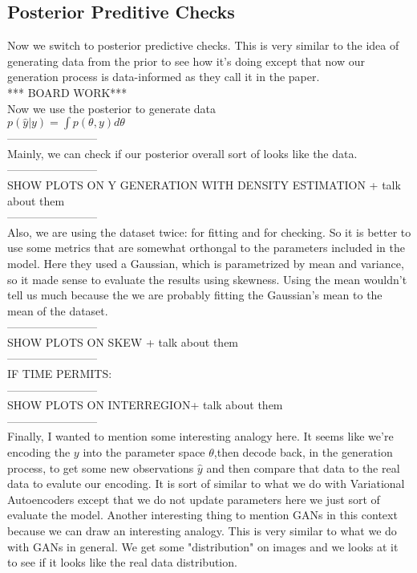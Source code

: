 \documentclass[]{article}
\begin{document}
\subsection*{Posterior Preditive Checks}
Now we switch to posterior predictive checks. This is very similar to the idea of generating data from the prior to see how it's doing except that now our generation process is data-informed as they call it in the paper.\\ 
*** BOARD WORK*** \\
Now we use the posterior to generate data \\
$p(\hat{y}| y) = \int p(\theta, y) d\theta$\\
------------------------\\
Mainly, we can check if our posterior overall sort of looks like the data.\\
------------------------ \\SHOW PLOTS ON Y GENERATION WITH DENSITY ESTIMATION + talk about them\\ ------------------------\\

Also, we are using the dataset twice: for fitting and for checking. So it is better to use some metrics that are somewhat orthongal to the parameters included in the model. Here they used a Gaussian, which is parametrized by mean and variance, so it made sense to evaluate the results using skewness. Using the mean wouldn't tell us much because the we are probably fitting the Gaussian's mean to the mean of the dataset.  \\
------------------------ \\SHOW PLOTS ON SKEW + talk about them\\ ------------------------\\
IF TIME PERMITS: \\ 
------------------------\\ SHOW PLOTS ON INTERREGION+ talk about them \\------------------------\\

Finally, I wanted to mention some interesting analogy here. It seems like we're encoding the $y$ into the parameter space $\theta$,then decode back, in the generation process, to get some new observations $\hat{y}$ and then compare that data to the real data to evalute our encoding. It is sort of similar to what we do with Variational Autoencoders except that we do not update parameters here we just sort of evaluate the model. Another interesting thing to mention GANs in this context because we can draw an interesting analogy. This is very similar to what we do with GANs in general. We get some "distribution" on images and we looks at it to see if it looks like the real data distribution.
\end{document}
